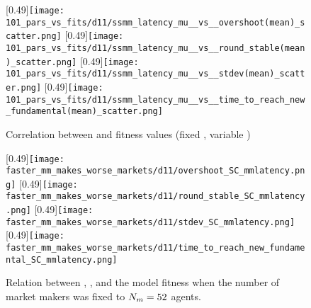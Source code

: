 \begin{figure}
	\centering
	[0.49\linewidth]{\texttt{[image: 101\_pars\_vs\_fits/d11/ssmm\_latency\_mu\_\_vs\_\_overshoot(mean)\_scatter.png]}}
	[0.49\linewidth]{\texttt{[image: 101\_pars\_vs\_fits/d11/ssmm\_latency\_mu\_\_vs\_\_round\_stable(mean)\_scatter.png]}}
	\vspace{0.5cm}
	[0.49\linewidth]{\texttt{[image: 101\_pars\_vs\_fits/d11/ssmm\_latency\_mu\_\_vs\_\_stdev(mean)\_scatter.png]}}
	[0.49\linewidth]{\texttt{[image: 101\_pars\_vs\_fits/d11/ssmm\_latency\_mu\_\_vs\_\_time\_to\_reach\_new\_fundamental(mean)\_scatter.png]}}
	\caption{Correlation between \ssmmlatencymu{} and fitness values (fixed \ssmmnAgents, variable \scnAgents)}
	\label{fig:d11_parvfit_ssmmlatencymu}
\end{figure}


\begin{figure}
     \centering
     \subcaptionbox{}
     [0.49\linewidth]{\texttt{[image: faster\_mm\_makes\_worse\_markets/d11/overshoot\_SC\_mmlatency.png]}}
     \subcaptionbox{}
     [0.49\linewidth]{\texttt{[image: faster\_mm\_makes\_worse\_markets/d11/round\_stable\_SC\_mmlatency.png]}}
     \vspace{0.5cm}
     \subcaptionbox{}
     [0.49\linewidth]{\texttt{[image: faster\_mm\_makes\_worse\_markets/d11/stdev\_SC\_mmlatency.png]}}
     \subcaptionbox{}
     [0.49\linewidth]{\texttt{[image: faster\_mm\_makes\_worse\_markets/d11/time\_to\_reach\_new\_fundamental\_SC\_mmlatency.png]}}
     \caption{Relation between \ssmmnAgents, \ssmmlatencymu, and the model fitness when the number of market makers was fixed to $N_{m} = 52$ agents.}
     \label{fig:faster_mm_makes_worse_markets/d11/SC_mmlatency}
\end{figure}


